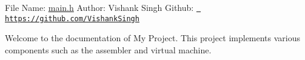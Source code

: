 File Name\+: \mbox{\hyperlink{main_8h}{main.\+h}} Author\+: Vishank Singh Github\+: \href{https://github.com/VishankSingh}{\texttt{ https\+://github.\+com/\+Vishank\+Singh}}

Welcome to the documentation of My Project. This project implements various components such as the assembler and virtual machine. 